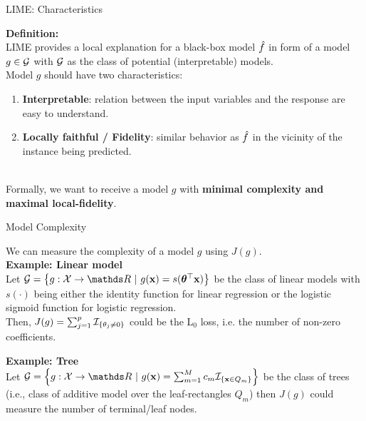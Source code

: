 \documentclass[11pt,compress,t,notes=noshow, aspectratio=169, xcolor=table]{beamer}
\begin{document}
\begin{vbframe}[c]{LIME: Characteristics}

    \textbf{Definition:}\\
	LIME provides a local explanation for a black-box model $\fh$ in form of a model $g \in \Gspace$ with $\Gspace$ as the class of potential (interpretable) models.\\[2em]
	
	
	Model $g$ should have two characteristics:
	\begin{enumerate}
		\item \textbf{Interpretable}: relation between the input variables and the response are easy to understand.  
		\item \textbf{Locally faithful / Fidelity}: similar behavior as $\fh$ in the vicinity of the instance being predicted.
	\end{enumerate}\\[2em]
	
	Formally, we want to receive a model $g$ with \textbf{minimal complexity and maximal local-fidelity}. 
\end{vbframe}


\begin{vbframe}[c]{Model Complexity}
    
    We can measure the complexity of a model $g$ using $J(g)$. \\[2em]

 	\textbf{Example: Linear model}\\
 	Let $\Gspace = \left\{g: \Xspace \to \R ~|~g(\xv) = s(\thetab^\top \xv)\right\}$ be the class of linear models with $s(\cdot)$ being either the identity function for linear regression or the logistic sigmoid function for logistic regression. \\
 	Then, $J(g) = \sum_{j = 1}^p \Ind_{\{ \theta_j \neq 0 \}}$ could be the L$_0$ loss, i.e. the number of non-zero coefficients. 
 	\vspace{0.5cm}
 	
 	\textbf{Example: Tree}\\
 	Let $\Gspace = \left\{g:\Xspace \to \R ~|~g(\xv) = \sum_{m=1}^M c_m \Ind_{\{ \xv \in Q_m \}}\right\}$ be the class of trees (i.e., class of additive model over the leaf-rectangles $Q_m$) then $J(g)$ could measure the number of terminal/leaf nodes.\\
 	
\end{vbframe}
 
\end{document}
